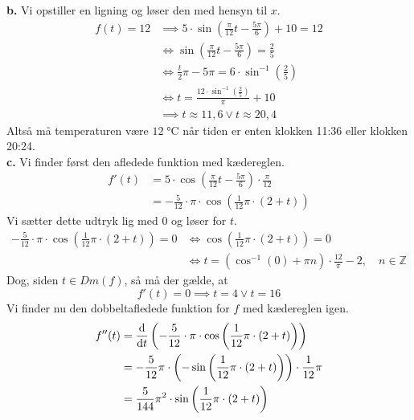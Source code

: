 \documentclass{article}
\begin{document}
\noindent \textbf{b.}
Vi opstiller en ligning og løser den med hensyn til $x$.
\begin{equation*}
\begin{split}
  f(t)= 12 &\implies 5 \cdot \sin \left(\frac{\pi}{12} t-\frac{5 \pi}{6}\right)+10=12\\ 
  &\iff \sin \left(\frac{\pi}{12} t-\frac{5 \pi}{6}\right)=\frac{2}{5}\\ 
  &\iff \frac{t}{2}\pi - 5\pi = 6 \cdot \sin^{-1}\left(\frac{2}{5}\right)\\ 
  &\iff t=\frac{12\cdot\sin^{-1}\left(\frac{2}{5}\right)}{\pi}+10\\ 
  &\implies t \approx 11,6 \lor t \approx 20,4
\end{split}
\end{equation*}
Altså må temperaturen være $12 \;\unit{\celsius} $ når tiden er enten klokken 11:36 eller klokken 20:24. \\[1ex]
\textbf{c.} Vi finder først den afledede funktion med kædereglen.
\begin{equation*}
\begin{split}
  f'(t)&=5\cdot \cos \left(\frac{\pi}{12} t-\frac{5 \pi}{6}\right) \cdot \frac{\pi}{12} \\ 
  &=- \frac{5}{12} \cdot \pi \cdot \cos \left(\frac{1}{12}\pi \cdot (2+t)\right)
\end{split}
\end{equation*}
Vi sætter dette udtryk lig med 0 og løser for $t$.
\begin{equation*}
\begin{split}
  - \frac{5}{12} \cdot \pi \cdot \cos \left(\frac{1}{12}\pi \cdot (2+t)\right)=0 &\iff \cos \left(\frac{1}{12}\pi \cdot (2+t)\right)=0 \\ 
  &\iff t=\left(\cos^{-1}(0)+\pi n\right) \cdot \frac{12}{\pi} -2, \quad n \in \mathbb{Z}
\end{split}
\end{equation*}
Dog, siden $t \in Dm(f)$, så må der gælde, at 
\[
f'(t)=0 \implies t=4 \lor t=16
\] 
Vi finder nu den dobbeltafledede funktion for $f$ med kædereglen igen. 
\begin{equation*}
\begin{split}
  f''(t)&=\dv{t} \left(- \frac{5}{12} \cdot \pi \cdot \cos \left(\frac{1}{12}\pi \cdot (2+t)\right)\right) \\ 
  &=-\frac{5}{12}\pi \cdot \left(-\sin\left(\frac{1}{12}\pi \cdot (2+t)\right)\right) \cdot \frac{1}{12} \pi \\ 
  &= \frac{5}{144} \pi^2\cdot \sin\left(\frac{1}{12}\pi \cdot (2+t)\right)
\end{split}
\end{equation*}
\end{document}
